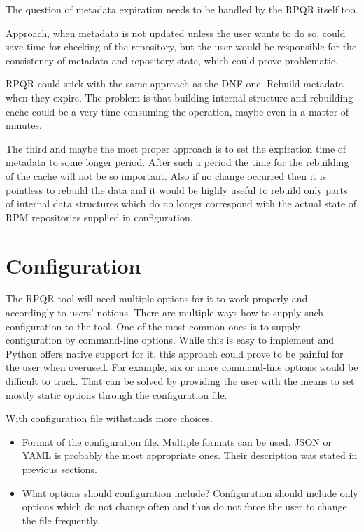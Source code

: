 The question of metadata expiration needs to be handled by the RPQR itself too.

Approach, when metadata is not updated unless the user wants to do so, could save time for
checking of the repository, but the user would be responsible for the consistency of metadata and repository
state, which could prove problematic.

RPQR could stick with the same approach as the DNF one. Rebuild metadata when they expire.
The problem is that building internal structure and rebuilding cache could be a very time-consuming
the operation, maybe even in a matter of minutes.

The third and maybe the most proper approach is to set the expiration time of metadata to some
longer period. After such a period the time for the rebuilding of the cache will not be so important.
Also if no change occurred then it is pointless to rebuild the data and it would be highly useful
to rebuild only parts of internal data structures which do no longer correspond with the actual state
of RPM repositories supplied in configuration.

\section{Configuration}
The RPQR tool will need multiple options for it to work properly and accordingly to
users' notions. There are multiple ways how to supply such configuration to the tool. One of the
most common ones is to supply configuration by command-line options. While this is easy to implement
and Python offers native support for it, this approach could prove to be painful for the user when
overused. For example, six or more command-line options would be difficult to track. That can be solved
by providing the user with the means to set mostly static options through the configuration file.

With configuration file withstands more choices.
\begin{itemize}
  \item Format of the configuration file.
        Multiple formats can be used. JSON or YAML is probably the most appropriate ones.
        Their description was stated in previous sections.
  \item What options should configuration include?
        Configuration should include only options which do not change often and thus do not force
        the user to change the file frequently.
\end{itemize}

